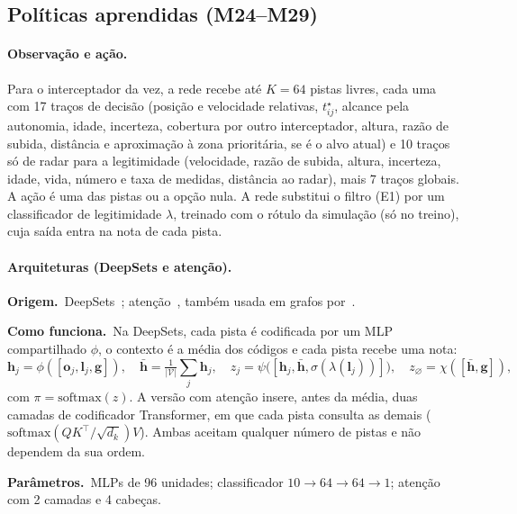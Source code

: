 \documentclass[11pt,a4paper]{article}
\newcommand{\orig}{\par\noindent\textbf{Origem.}~}
\newcommand{\func}{\par\noindent\textbf{Como funciona.}~}
\newcommand{\parm}{\par\noindent\textbf{Parâmetros.}~}
\begin{document}
\subsection{Políticas aprendidas (M24--M29)}\label{sec:redes}

\paragraph{Observação e ação.} Para o interceptador da vez, a rede recebe até $K=64$ pistas livres, cada uma com 17 traços
de decisão (posição e velocidade relativas, $t^\star_{ij}$, alcance pela autonomia, idade, incerteza, cobertura por outro
interceptador, altura, razão de subida, distância e aproximação à zona prioritária, se é o alvo atual) e 10 traços só de
radar para a legitimidade (velocidade, razão de subida, altura, incerteza, idade, vida, número e taxa de medidas,
distância ao radar), mais 7 traços globais. A ação é uma das pistas ou a opção nula. A rede substitui o filtro (E1) por
um classificador de legitimidade $\lambda$, treinado com o rótulo da simulação (só no treino), cuja saída entra na nota
de cada pista.

\paragraph{Arquiteturas (DeepSets e atenção).}
\orig DeepSets~\cite{zaheer2017}; atenção~\cite{vaswani2017,kool2019}, também usada em grafos por~\cite{jia2026}.
\func Na DeepSets, cada pista é codificada por um MLP compartilhado $\phi$, o contexto é a média dos códigos e cada pista
recebe uma nota:
\begin{equation}
  \bm{h}_j=\phi([\bm{o}_j,\bm{l}_j,\bm{g}]),\quad \bar{\bm{h}}=\tfrac{1}{|\mathcal{V}|}\textstyle\sum_{j}\bm{h}_j,\quad
  z_j=\psi\big([\bm{h}_j,\bar{\bm{h}},\sigma(\lambda(\bm{l}_j))]\big),\quad z_{\varnothing}=\chi([\bar{\bm{h}},\bm{g}]),
\end{equation}
com $\pi=\mathrm{softmax}(z)$. A versão com atenção insere, antes da média, duas camadas de codificador Transformer, em que
cada pista consulta as demais ($\mathrm{softmax}(QK^\top/\sqrt{d_k})V$). Ambas aceitam qualquer número de pistas e não
dependem da sua ordem.
\parm MLPs de 96 unidades; classificador $10\to64\to64\to1$; atenção com 2 camadas e 4 cabeças.
\end{document}
